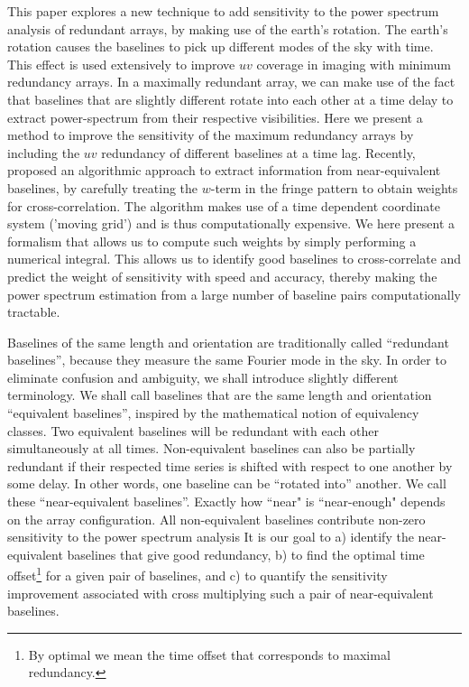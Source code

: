 \documentclass[twocolumn,apj,numberedappendix]{emulateapj}
\renewcommand\[{\begin{equation}}
\renewcommand\]{\end{equation}}
\begin{document}
This paper explores a new technique to add sensitivity to the power spectrum analysis
of redundant arrays, by making use of the earth's rotation. 
The earth's rotation causes the baselines to pick up different modes of the sky with time. 
This effect is used extensively to improve $uv$ coverage in imaging with minimum redundancy arrays. In
a maximally redundant array, we can make use of the fact that baselines that are slightly different
rotate into each other at a time delay to extract power-spectrum from their respective visibilities. Here we present a method to
improve the sensitivity of the maximum redundancy arrays by including
the $uv$ redundancy of different baselines at a time lag. Recently, \cite{wterm} proposed an algorithmic approach to extract information from near-equivalent baselines, by carefully treating the $w$-term in the fringe pattern to obtain weights for cross-correlation. The algorithm makes use of a time dependent coordinate system ('moving grid') and is thus computationally expensive. We here present a formalism that allows us to compute such weights by simply performing a numerical integral. This allows us to identify good baselines to cross-correlate and predict the weight of sensitivity with speed and accuracy, thereby making the power spectrum estimation from a large number of baseline pairs computationally tractable. 

Baselines of the same length and orientation are traditionally called
``redundant baselines'', because they measure the same Fourier mode
in the sky. In order to eliminate confusion and ambiguity, we shall
introduce slightly different terminology. We shall call baselines that
are the same length and orientation ``equivalent baselines'', inspired
by the mathematical notion of equivalency classes. Two equivalent
baselines will be redundant with each other simultaneously at all
times. Non-equivalent baselines can also be partially redundant if their
respected time series is shifted with respect to one another by some delay. In other words, one baseline can be ``rotated into''
another. We call these ``near-equivalent baselines''. Exactly how ``near" is ``near-enough" depends on the array configuration. All non-equivalent baselines contribute non-zero sensitivity to the power spectrum analysis It is our
goal to a) identify the near-equivalent baselines that give good
redundancy, b) to find the optimal time offset\footnote{By optimal we mean the time offset that corresponds to maximal redundancy. } for a given pair of baselines, and
c) to quantify the sensitivity improvement associated with cross multiplying
such a pair of near-equivalent baselines. 
\end{document}
